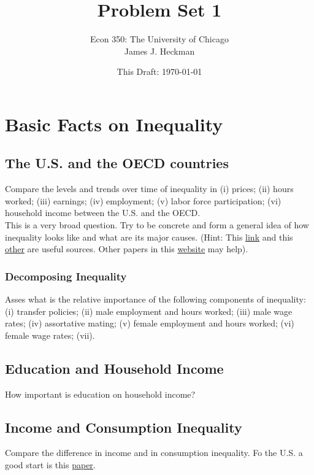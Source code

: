



\title{\textbf{Problem Set 1}}
\author{Econ 350: The University of Chicago \\ James J. Heckman}
\date{This Draft: \today}
\maketitle

\section{Basic Facts on Inequality}
\subsection{The U.S. and the OECD countries}
\noindent Compare the levels and trends over time of inequality in (i) prices; (ii) hours worked; (iii) earnings; (iv) employment; (v) labor force participation; (vi) household income between the U.S. and the OECD.\\ 
\indent This is a very broad question. Try to be concrete and form a general idea of how inequality looks like and what are its major causes. (Hint: This \href{http://jenni.uchicago.edu/econ350/slides/wage-ed-facts_ECON-350_2013-01-14a_jsw.pdf}{link} and this \href{www.oecd-ilibrary.org.proxy.uchicago.edu/social-issues-migration-health/the-causes-of-growing-inequalities-in-oecd-countries_9789264119536-en}{other} are useful sources. Other papers in this \href{https://heckman.uchicago.edu/page/economics-350}{website} may help). 
\subsubsection{Decomposing Inequality}
Asses what is the relative importance of the following components of inequality: (i) transfer policies; (ii) male employment and hours worked; (iii) male wage rates; (iv) assortative mating; (v) female employment and hours worked; (vi) female wage rates; (vii).\\
\subsection{Education and Household Income}
\noindent How important is education on household income?
\subsection{Income and Consumption Inequality}
Compare the difference in income and in consumption inequality. Fo the U.S. a good start is this \href{http://jenni.uchicago.edu/econ350/papers/Meyer_Sullivan_2012_AEIMonograph4-3.pdf}{paper}.
